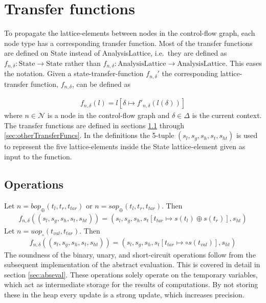\section{Transfer functions}
\label{sec:transferf}
\newcommand{\letin}[1]{\texttt{let } #1 \texttt{ in }}
\newcommand{\ifelse}[3]{\texttt{if }#1\texttt{ then } #2 \texttt{ else } #3}
\newcommand{\match}[1]{\texttt{match }#1}
\newcommand{\with}[1]{\texttt{with }#1\text{: }}
\newcommand{\coerce}[2]{c_{\text{#1}, \text{#2}}}
\newcommand{\default}{\texttt{default: }}
To propagate the lattice-elements between nodes in the control-flow graph, each node type has a corresponding transfer function. Most of the transfer functions are defined on State instead of {AnalysisLattice}, i.e.\ they are defined as $f_{n,\delta} : \text{State} \rightarrow \text{State}$ rather than $f_{n,\delta} : \text{AnalysisLattice} \rightarrow \text{AnalysisLattice}$. This eases the notation. Given a state-transfer-function $f_{n,\delta}'$ the corresponding lattice-transfer function, $f_{n,\delta}$, can be defined as

\begin{align}
f_{n,\delta}(l) = l[\delta\mapsto f'_{n, \delta}(l(\delta))]
\end{align}
where $n\in\mathcal{N}$ is a node in the control-flow graph and $\delta\in \Delta$ is the current context. The transfer functions are defined in sections \ref{sec:operations} through \ref{sec:otherTransferFuncs}. In the definitions the 5-tuple $(s_l, s_g, s_h, s_t, s_{ht})$ is used to represent the five lattice-elements inside the State lattice-element given as input to the function.

\subsection{Operations}
\label{sec:operations}
Let $n = \mathit{bop}_\oplus(t_l,t_r,t_{tar})$ or $n =  \mathit{sop}_\oplus(t_l,t_r,t_{tar})$. Then 
\begin{align}
f_{n,\delta}((s_l, s_g, s_h, s_t, s_{ht})) = (s_l, s_g, s_h, s_t[t_{tar}\mapsto s(t_l)\oplus s(t_r)], s_{ht})
\end{align}
Let $n = uop_\circ(t_{val},t_{tar})$. Then
\begin{align}
f_{n,\delta}((s_l, s_g, s_h, s_t, s_{ht})) = (s_l, s_g, s_h, s_t[t_{tar}\mapsto \circ s(t_{val})], s_{ht})
\end{align}
The soundness of the binary, unary, and short-circuit operations follow from the subsequent implementation of the abstract evaluation. This is covered in detail in section \ref{sec:abseval}. These operations solely operate on the temporary variables, which act as intermediate storage for the results of computations. By not storing these in the heap every update is a strong update, which increases precision.


